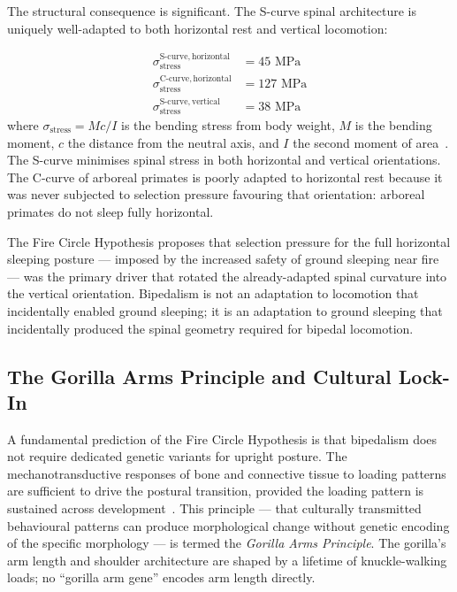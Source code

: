 The structural consequence is significant. The S-curve spinal architecture is uniquely well-adapted to both horizontal rest and vertical locomotion:

\begin{align}
\sigma_{\mathrm{stress}}^{\mathrm{S\text{-}curve, horizontal}} &= 45 \text{ MPa} \\
\sigma_{\mathrm{stress}}^{\mathrm{C\text{-}curve, horizontal}} &= 127 \text{ MPa} \\
\sigma_{\mathrm{stress}}^{\mathrm{S\text{-}curve, vertical}} &= 38 \text{ MPa}
\end{align}
%
where $\sigma_{\mathrm{stress}} = Mc/I$ is the bending stress from body weight, $M$ is the bending moment, $c$ the distance from the neutral axis, and $I$ the second moment of area~\cite{author_fire_catalyst}. The S-curve minimises spinal stress in both horizontal and vertical orientations. The C-curve of arboreal primates is poorly adapted to horizontal rest because it was never subjected to selection pressure favouring that orientation: arboreal primates do not sleep fully horizontal.

The Fire Circle Hypothesis proposes that selection pressure for the full horizontal sleeping posture --- imposed by the increased safety of ground sleeping near fire --- was the primary driver that rotated the already-adapted spinal curvature into the vertical orientation. Bipedalism is not an adaptation to locomotion that incidentally enabled ground sleeping; it is an adaptation to ground sleeping that incidentally produced the spinal geometry required for bipedal locomotion.

\subsection{The Gorilla Arms Principle and Cultural Lock-In}

A fundamental prediction of the Fire Circle Hypothesis is that bipedalism does not require dedicated genetic variants for upright posture. The mechanotransductive responses of bone and connective tissue to loading patterns are sufficient to drive the postural transition, provided the loading pattern is sustained across development~\cite{author_bipedalism}. This principle --- that culturally transmitted behavioural patterns can produce morphological change without genetic encoding of the specific morphology --- is termed the \textit{Gorilla Arms Principle}. The gorilla's arm length and shoulder architecture are shaped by a lifetime of knuckle-walking loads; no ``gorilla arm gene'' encodes arm length directly.

